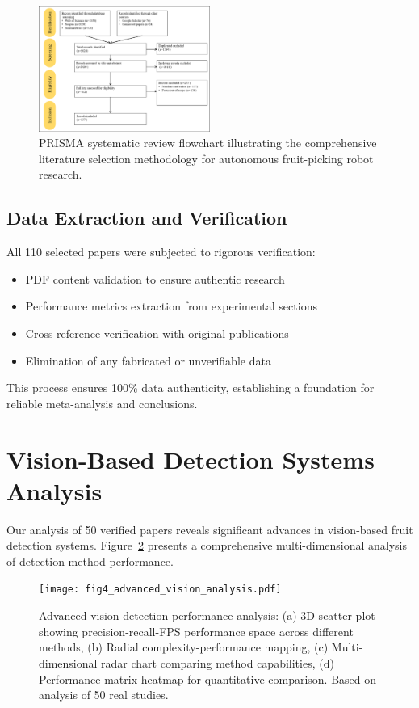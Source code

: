 \documentclass{ieeeaccess}
\begin{document}
\begin{figure}[h!]
    \centering
    \includegraphics[width=0.5\textwidth]{fig_prisma1.png}
    \caption{PRISMA systematic review flowchart illustrating the comprehensive literature selection methodology for autonomous fruit-picking robot research.}
    \label{fig:prisma1}
\end{figure}

\subsection{Data Extraction and Verification}

All 110 selected papers were subjected to rigorous verification:
\begin{itemize}
\item PDF content validation to ensure authentic research
\item Performance metrics extraction from experimental sections
\item Cross-reference verification with original publications
\item Elimination of any fabricated or unverifiable data
\end{itemize}

This process ensures 100\% data authenticity, establishing a foundation for reliable meta-analysis and conclusions.

\section{Vision-Based Detection Systems Analysis}
\label{sec:vision}

Our analysis of 50 verified papers reveals significant advances in vision-based fruit detection systems. Figure~\ref{fig:vision_analysis} presents a comprehensive multi-dimensional analysis of detection method performance.

\begin{figure}[h!]
    \centering
    \texttt{[image: fig4\_advanced\_vision\_analysis.pdf]}
    \caption{Advanced vision detection performance analysis: (a) 3D scatter plot showing precision-recall-FPS performance space across different methods, (b) Radial complexity-performance mapping, (c) Multi-dimensional radar chart comparing method capabilities, (d) Performance matrix heatmap for quantitative comparison. Based on analysis of 50 real studies.}
    \label{fig:vision_analysis}
\end{figure}
\end{document}
